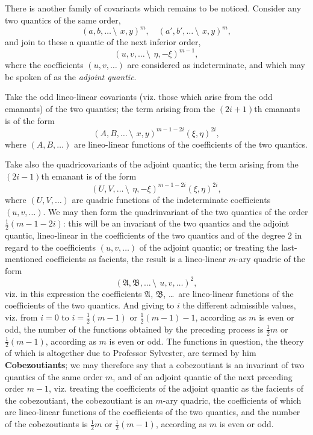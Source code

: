 \documentclass[11pt,a4paper]{book}
\begin{document}
\begin{center}
\subsection{}

There is another family of covariants which remains to be noticed. Consider any two quantics of the same order,
\[
(a, b, \ldots \,\setminus\!\!\:\, x, y)^m, \quad (a', b', \ldots \,\setminus\!\!\:\, x, y)^m,
\]
and join to these a quantic of the next inferior order,
\[
(u, v, \ldots \,\setminus\!\!\:\, \eta, -\xi)^{m-1},
\]
where the coefficients $(u, v, \ldots)$ are considered as indeterminate, and which may be spoken of as the \textit{adjoint quantic}.

Take the odd lineo-linear covariants (viz. those which arise from the odd emanants) of the two quantics; the term arising from the $(2i+1)$th emanants is of the form
\[
(A, B, \ldots \,\setminus\!\!\:\, x, y)^{m-1-2i}(\xi, \eta)^{2i},
\]
where $(A, B, \ldots)$ are lineo-linear functions of the coefficients of the two quantics.

Take also the quadricovariants of the adjoint quantic; the term arising from the $(2i-1)$th emanant is of the form
\[
(U, V, \ldots \,\setminus\!\!\:\, \eta, -\xi)^{m-1-2i}(\xi, \eta)^{2i},
\]
where $(U, V, \ldots)$ are quadric functions of the indeterminate coefficients $(u, v, \ldots)$. We may then form the quadrinvariant of the two quantics of the order $\frac{1}{2}(m - 1 - 2i)$: this will be an invariant of the two quantics and the adjoint quantic, lineo-linear in the coefficients of the two quantics and of the degree $2$ in regard to the coefficients $(u, v, \ldots)$ of the adjoint quantic; or treating the last-mentioned coefficients as facients, the result is a lineo-linear $m$-ary quadric of the form
\[
(\mathfrak{A}, \mathfrak{B}, \ldots \,\setminus\!\!\:\, u, v, \ldots)^2,
\]
viz. in this expression the coefficients $\mathfrak{A}$, $\mathfrak{B}$, \ldots\ are lineo-linear functions of the coefficients of the two quantics. And giving to $i$ the different admissible values, viz. from $i = 0$ to $i = \frac{1}{2}(m - 1)$ or $\frac{1}{2}(m - 1) - 1$, according as $m$ is even or odd, the number of the functions obtained by the preceding process is $\frac{1}{2}m$ or $\frac{1}{2}(m - 1)$, according as $m$ is even or odd. The functions in question, the theory of which is altogether due to Professor Sylvester, are termed by him \textbf{Cobezoutiants}; we may therefore say that a cobezoutiant is an invariant of two quantics of the same order $m$, and of an adjoint quantic of the next preceding order $m-1$, viz. treating the coefficients of the adjoint quantic as the facients of the cobezoutiant, the cobezoutiant is an $m$-ary quadric, the coefficients of which are lineo-linear functions of the coefficients of the two quantics, and the number of the cobezoutiants is $\frac{1}{2}m$ or $\frac{1}{2}(m - 1)$, according as $m$ is even or odd.


\end{center}
\end{document}
